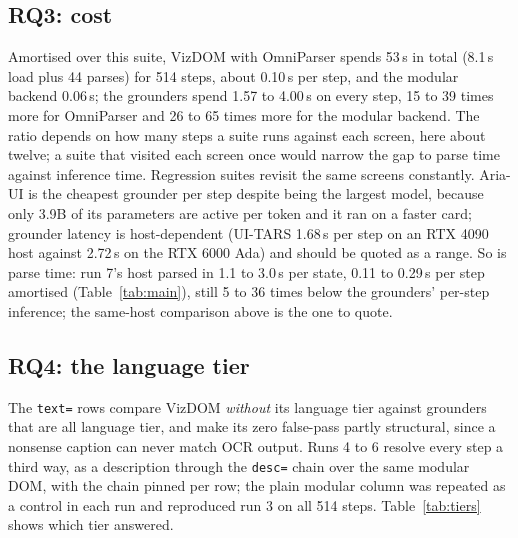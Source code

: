 \documentclass[conference]{IEEEtran}
\newcommand{\code}[1]{\texttt{#1}}
\begin{document}
\subsection{RQ3: cost}
Amortised over this suite, VizDOM with OmniParser spends 53\,s in total (8.1\,s load plus 44 parses) for 514 steps, about 0.10\,s per step, and the modular backend 0.06\,s; the grounders spend 1.57 to 4.00\,s on every step, 15 to 39 times more for OmniParser and 26 to 65 times more for the modular backend. The ratio depends on how many steps a suite runs against each screen, here about twelve; a suite that visited each screen once would narrow the gap to parse time against inference time. Regression suites revisit the same screens constantly. Aria-UI is the cheapest grounder per step despite being the largest model, because only 3.9B of its parameters are active per token and it ran on a faster card; grounder latency is host-dependent (UI-TARS 1.68\,s per step on an RTX 4090 host against 2.72\,s on the RTX 6000 Ada) and should be quoted as a range. So is parse time: run 7's host parsed in 1.1 to 3.0\,s per state, 0.11 to 0.29\,s per step amortised (Table~\ref{tab:main}), still 5 to 36 times below the grounders' per-step inference; the same-host comparison above is the one to quote.

\subsection{RQ4: the language tier}
\label{sec:rq4}
The \code{text=} rows compare VizDOM \emph{without} its language tier against grounders that are all language tier, and make its zero false-pass partly structural, since a nonsense caption can never match OCR output. Runs 4 to 6 resolve every step a third way, as a description through the \code{desc=} chain over the same modular DOM, with the chain pinned per row; the plain modular column was repeated as a control in each run and reproduced run 3 on all 514 steps. Table~\ref{tab:tiers} shows which tier answered.
\end{document}

